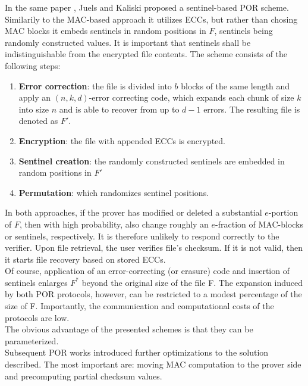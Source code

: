 In the same paper \cite{por}, Juels and Kaliski proposed a sentinel-based POR
scheme. Similarily to the MAC-based approach it utilizes ECCs, but rather than
chosing MAC blocks it embeds sentinels in random positions in $F$, sentinels
being randomly constructed values. It is important that sentinels shall be
indistinguishable from the encrypted file contents. The scheme consists of the
following steps:

\begin{enumerate}
	\item \textbf{Error correction}: the file is divided into $b$ blocks of the
	same length and apply an $(n,k,d)$-error correcting code,
	which expands each chunk of size $k$ into size $n$ and is able to recover
	from up to $d-1$ errors. The resulting file is denoted as $F'$.
	\item \textbf{Encryption}: the file with appended ECCs is encrypted.
	\item \textbf{Sentinel creation}: the randomly constructed sentinels are
	embedded in random positions in $F'$
	\item \textbf{Permutation}: which randomizes sentinel positions.
\end{enumerate}

In both approaches, if the prover has modified or deleted a substantial 
$e$-portion of $F$, then with high probability, also change roughly an
$e$-fraction of MAC-blocks or sentinels, respectively. It is therefore unlikely
to respond correctly to the verifier. Upon file retrieval, the user verifies
file's checksum. If it is not valid, then it starts file recovery based on
stored ECCs.\\

Of course, application of an error-correcting (or erasure) code and insertion
of sentinels enlarges $F^{*}$ beyond the original size of the file F. The
expansion induced by both POR protocols, however, can be restricted to a modest
percentage of the size of F. Importantly, the communication and computational
costs of the protocols are low.\\

The obvious advantage of the presented schemes is that they can be
parameterized.\\

Subsequent POR works \cite{compact-por, por2, hail, venus, iris} introduced
further optimizations to the solution described. The most important are:
moving MAC computation to the prover side and precomputing partial checksum
values.\\


